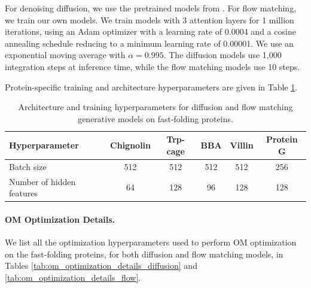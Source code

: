 For denoising diffusion, we use the pretrained models from \citet{arts2023two}. For flow matching, we train our own models. We train models with 3 attention layers for 1 million iterations, using an Adam optimizer with a learning rate of 0.0004 and a cosine annealing schedule reducing to a minimum learning rate of 0.00001. We use an exponential moving average with $\alpha = 0.995$. The diffusion models use 1,000 integration steps at inference time, while the flow matching models use 10 steps. 

Protein-specific training and architecture hyperparameters are given in Table \ref{tab:fastfolder_architecture_training}.



\begin{table}[h]
\caption{Architecture and training hyperparameters for diffusion and flow matching generative models on fast-folding proteins.}
\label{tab:fastfolder_architecture_training}
\scriptsize
\centering
    \begin{tabular}{lccccc}
        \toprule
        \textbf{Hyperparameter} & \textbf{Chignolin} & \textbf{Trp-cage} & \textbf{BBA} & \textbf{Villin} & \textbf{Protein G} \\
        \midrule
        Batch size & 512 & 512 & 512 & 512 & 256 \\
        Number of hidden features & 64 & 128 & 96 & 128 & 128 \\
        \bottomrule
    \end{tabular}
\end{table}

\paragraph{OM Optimization Details.}

We list all the optimization hyperparameters used to perform OM optimization on the fast-folding proteins, for both diffusion and flow matching models, in Tables \ref{tab:om_optimization_details_diffusion} and \ref{tab:om_optimization_details_flow}.

